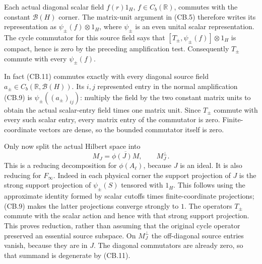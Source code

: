\documentclass[
  11pt,
]{article}
\begin{document}
Each actual diagonal scalar field \(f(r)1_H\), \(f\in C_b(\mathbb R)\),
commutes with the constant \(\mathcal B(H)\) corner. The matrix-unit
argument in (CB.5) therefore writes its representation as
\(\psi_\pm(f)\otimes1_H\), where \(\psi_\pm\) is an even unital scalar
representation. The cycle commutator for this source field says that
\([T_\pm,\psi_\pm(f)]\otimes1_H\) is compact, hence is zero by the
preceding amplification test. Consequently \(T_\pm\) commute with every
\(\psi_\pm(f)\).

In fact (CB.11) commutes exactly with every diagonal source field
\(a_\pm\in C_b(\mathbb R,\mathcal B(H))\). Its \(i,j\) represented entry
in the normal amplification (CB.9) is \(\psi_\pm((a_\pm)_{ij})\):
multiply the field by the two constant matrix units to obtain the actual
scalar-entry field times one matrix unit. Since \(T_\pm\) commute with
every such scalar entry, every matrix entry of the commutator is zero.
Finite-coordinate vectors are dense, so the bounded commutator itself is
zero.

Only now split the actual Hilbert space into \[
 M_J=\overline{\phi(J)M},\qquad M_J^\perp.
 \tag{CB.12}
\] This is a reducing decomposition for \(\phi(A_\ell)\), because \(J\)
is an ideal. It is also reducing for \(F_\infty\). Indeed in each
physical corner the support projection of \(J\) is the strong support
projection of \(\psi_\pm(S)\) tensored with \(1_H\). This follows using
the approximate identity formed by scalar cutoffs times
finite-coordinate projections; (CB.9) makes the latter projections
converge strongly to \(1\). The operators \(T_\pm\) commute with the
scalar action and hence with that strong support projection. This proves
reduction, rather than assuming that the original cycle operator
preserved an essential source subspace. On \(M_J^\perp\) the
off-diagonal source entries vanish, because they are in \(J\). The
diagonal commutators are already zero, so that summand is degenerate by
(CB.11).
\end{document}
